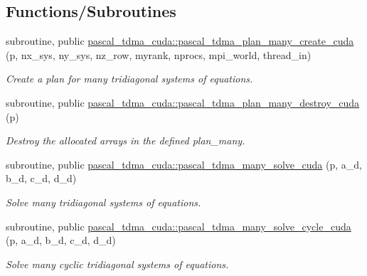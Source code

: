 \subsection*{Functions/\+Subroutines}
\textbf{ }\par
\begin{DoxyCompactItemize}
\item 
subroutine, public \hyperlink{namespacepascal__tdma__cuda_a84c442c238f7d1a18eef430aaa15e6c1}{pascal\+\_\+tdma\+\_\+cuda\+::pascal\+\_\+tdma\+\_\+plan\+\_\+many\+\_\+create\+\_\+cuda} (p, nx\+\_\+sys, ny\+\_\+sys, nz\+\_\+row, myrank, nprocs, mpi\+\_\+world, thread\+\_\+in)
\begin{DoxyCompactList}\small\item\em Create a plan for many tridiagonal systems of equations. \end{DoxyCompactList}\item 
subroutine, public \hyperlink{namespacepascal__tdma__cuda_a70734ba15cf5a093ac3ba2ccbc4f5330}{pascal\+\_\+tdma\+\_\+cuda\+::pascal\+\_\+tdma\+\_\+plan\+\_\+many\+\_\+destroy\+\_\+cuda} (p)
\begin{DoxyCompactList}\small\item\em Destroy the allocated arrays in the defined plan\+\_\+many. \end{DoxyCompactList}\item 
subroutine, public \hyperlink{namespacepascal__tdma__cuda_a0043d538e133925d9a37bf7bcdaf4b08}{pascal\+\_\+tdma\+\_\+cuda\+::pascal\+\_\+tdma\+\_\+many\+\_\+solve\+\_\+cuda} (p, a\+\_\+d, b\+\_\+d, c\+\_\+d, d\+\_\+d)
\begin{DoxyCompactList}\small\item\em Solve many tridiagonal systems of equations. \end{DoxyCompactList}\item 
subroutine, public \hyperlink{namespacepascal__tdma__cuda_afdd30998c4a8aecc093c823e3212b57a}{pascal\+\_\+tdma\+\_\+cuda\+::pascal\+\_\+tdma\+\_\+many\+\_\+solve\+\_\+cycle\+\_\+cuda} (p, a\+\_\+d, b\+\_\+d, c\+\_\+d, d\+\_\+d)
\begin{DoxyCompactList}\small\item\em Solve many cyclic tridiagonal systems of equations. \end{DoxyCompactList}\end{DoxyCompactItemize}


